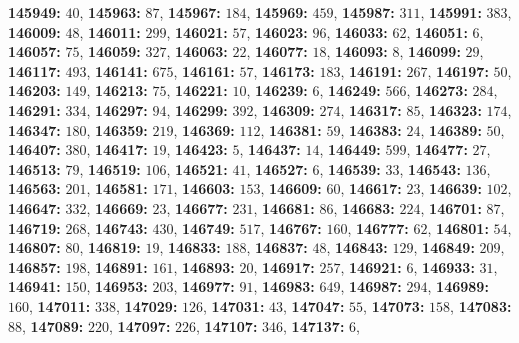 \textsf{\bfseries 145949:} $40$, \textsf{\bfseries 145963:} $87$, \textsf{\bfseries 145967:} $184$, \textsf{\bfseries 145969:} $459$, \textsf{\bfseries 145987:} $311$, \textsf{\bfseries 145991:} $383$, \textsf{\bfseries 146009:} $48$, \textsf{\bfseries 146011:} $299$, \textsf{\bfseries 146021:} $57$, \textsf{\bfseries 146023:} $96$, \textsf{\bfseries 146033:} $62$, \textsf{\bfseries 146051:} $6$, \textsf{\bfseries 146057:} $75$, \textsf{\bfseries 146059:} $327$, \textsf{\bfseries 146063:} $22$, \textsf{\bfseries 146077:} $18$, \textsf{\bfseries 146093:} $8$, \textsf{\bfseries 146099:} $29$, \textsf{\bfseries 146117:} $493$, \textsf{\bfseries 146141:} $675$, \textsf{\bfseries 146161:} $57$, \textsf{\bfseries 146173:} $183$, \textsf{\bfseries 146191:} $267$, \textsf{\bfseries 146197:} $50$, \textsf{\bfseries 146203:} $149$, \textsf{\bfseries 146213:} $75$, \textsf{\bfseries 146221:} $10$, \textsf{\bfseries 146239:} $6$, \textsf{\bfseries 146249:} $566$, \textsf{\bfseries 146273:} $284$, \textsf{\bfseries 146291:} $334$, \textsf{\bfseries 146297:} $94$, \textsf{\bfseries 146299:} $392$, \textsf{\bfseries 146309:} $274$, \textsf{\bfseries 146317:} $85$, \textsf{\bfseries 146323:} $174$, \textsf{\bfseries 146347:} $180$, \textsf{\bfseries 146359:} $219$, \textsf{\bfseries 146369:} $112$, \textsf{\bfseries 146381:} $59$, \textsf{\bfseries 146383:} $24$, \textsf{\bfseries 146389:} $50$, \textsf{\bfseries 146407:} $380$, \textsf{\bfseries 146417:} $19$, \textsf{\bfseries 146423:} $5$, \textsf{\bfseries 146437:} $14$, \textsf{\bfseries 146449:} $599$, \textsf{\bfseries 146477:} $27$, \textsf{\bfseries 146513:} $79$, \textsf{\bfseries 146519:} $106$, \textsf{\bfseries 146521:} $41$, \textsf{\bfseries 146527:} $6$, \textsf{\bfseries 146539:} $33$, \textsf{\bfseries 146543:} $136$, \textsf{\bfseries 146563:} $201$, \textsf{\bfseries 146581:} $171$, \textsf{\bfseries 146603:} $153$, \textsf{\bfseries 146609:} $60$, \textsf{\bfseries 146617:} $23$, \textsf{\bfseries 146639:} $102$, \textsf{\bfseries 146647:} $332$, \textsf{\bfseries 146669:} $23$, \textsf{\bfseries 146677:} $231$, \textsf{\bfseries 146681:} $86$, \textsf{\bfseries 146683:} $224$, \textsf{\bfseries 146701:} $87$, \textsf{\bfseries 146719:} $268$, \textsf{\bfseries 146743:} $430$, \textsf{\bfseries 146749:} $517$, \textsf{\bfseries 146767:} $160$, \textsf{\bfseries 146777:} $62$, \textsf{\bfseries 146801:} $54$, \textsf{\bfseries 146807:} $80$, \textsf{\bfseries 146819:} $19$, \textsf{\bfseries 146833:} $188$, \textsf{\bfseries 146837:} $48$, \textsf{\bfseries 146843:} $129$, \textsf{\bfseries 146849:} $209$, \textsf{\bfseries 146857:} $198$, \textsf{\bfseries 146891:} $161$, \textsf{\bfseries 146893:} $20$, \textsf{\bfseries 146917:} $257$, \textsf{\bfseries 146921:} $6$, \textsf{\bfseries 146933:} $31$, \textsf{\bfseries 146941:} $150$, \textsf{\bfseries 146953:} $203$, \textsf{\bfseries 146977:} $91$, \textsf{\bfseries 146983:} $649$, \textsf{\bfseries 146987:} $294$, \textsf{\bfseries 146989:} $160$, \textsf{\bfseries 147011:} $338$, \textsf{\bfseries 147029:} $126$, \textsf{\bfseries 147031:} $43$, \textsf{\bfseries 147047:} $55$, \textsf{\bfseries 147073:} $158$, \textsf{\bfseries 147083:} $88$, \textsf{\bfseries 147089:} $220$, \textsf{\bfseries 147097:} $226$, \textsf{\bfseries 147107:} $346$, \textsf{\bfseries 147137:} $6$, 
